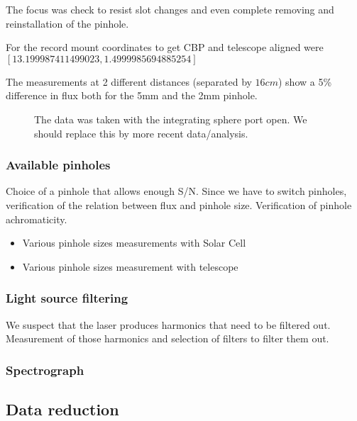 \documentclass[onecolumn]{aa}
\begin{document}
The focus was check to resist slot changes and even complete removing and
reinstallation of the pinhole.

For the record mount coordinates to get CBP and telescope aligned were
$[13.199987411499023, 1.4999985694885254]$

The measurements at 2 different distances (separated by $16 cm$) show a 5\%
difference in flux both for the 5mm and the 2mm pinhole.

\begin{figure}[!ht]
\begin{center}
\end{center}
\caption[]{The data was taken with the integrating sphere port open. We should
  replace this by more recent data/analysis.}
\label{fig:distancevariation}
\end{figure}


\subsubsection{Available pinholes}

Choice of a pinhole that allows enough S/N. Since we have to switch pinholes,
verification of the relation between flux and pinhole size. Verification of
pinhole achromaticity.

\begin{itemize}
\item Various pinhole sizes measurements with Solar Cell
\item Various pinhole sizes measurement with telescope
\end{itemize}



\subsubsection{Light source filtering}

We suspect that the laser produces harmonics that need to be filtered
out. Measurement of those harmonics and selection of filters to filter them
out. 


\subsubsection{Spectrograph}


\subsection{Data reduction}
\end{document}
